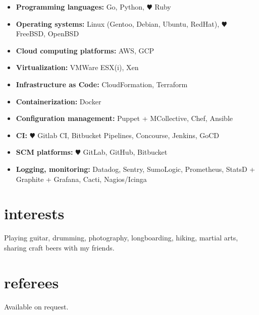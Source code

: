 \documentclass[]{friggeri-cv}
\begin{document}
\begin{itemize}
  \item \textbf{Programming languages:}
        Go, Python, {\color{red} $\varheartsuit$} Ruby
  \item \textbf{Operating systems:}
        Linux (Gentoo, Debian, Ubuntu, RedHat), {\color{red} $\varheartsuit$} FreeBSD, OpenBSD
  \item \textbf{Cloud computing platforms:}
        AWS, GCP
  \item \textbf{Virtualization:}
        VMWare ESX(i), Xen
  \item \textbf{Infrastructure as Code:}
        CloudFormation, Terraform
  \item \textbf{Containerization:}
        Docker
  \item \textbf{Configuration management:}
        Puppet + MCollective, Chef, Ansible
  \item \textbf{CI:}
        {\color{red} $\varheartsuit$} Gitlab CI, Bitbucket Pipelines, Concourse, Jenkins, GoCD
  \item \textbf{SCM platforms:}
        {\color{red} $\varheartsuit$} GitLab, GitHub, Bitbucket
  \item \textbf{Logging, monitoring:}
        Datadog, Sentry, SumoLogic, Prometheus, StatsD + Graphite + Grafana,
        Cacti, Nagios/Icinga
\end{itemize}



\section{interests}

Playing guitar, drumming, photography, longboarding, hiking, martial arts,
sharing craft beers with my friends.



\section{referees}

Available on request.
\end{document}
